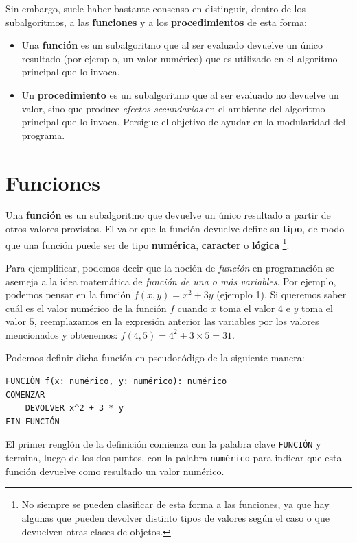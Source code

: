 \documentclass[
]{book}
\providecommand{\tightlist}{%
  \setlength{\itemsep}{0pt}\setlength{\parskip}{0pt}}
\begin{document}
Sin embargo, suele haber bastante consenso en distinguir, dentro de los subalgoritmos, a las \textbf{funciones} y a los \textbf{procedimientos} de esta forma:

\begin{itemize}
\tightlist
\item
  Una \textbf{función} es un subalgoritmo que al ser evaluado devuelve un único resultado (por ejemplo, un valor numérico) que es utilizado en el algoritmo principal que lo invoca.
\item
  Un \textbf{procedimiento} es un subalgoritmo que al ser evaluado no devuelve un valor, sino que produce \emph{efectos secundarios} en el ambiente del algoritmo principal que lo invoca. Persigue el objetivo de ayudar en la modularidad del programa.
\end{itemize}

\hypertarget{funciones}{%
\section{Funciones}\label{funciones}}

Una \textbf{función} es un subalgoritmo que devuelve un único resultado a partir de otros valores provistos. El valor que la función devuelve define su \textbf{tipo}, de modo que una función puede ser de tipo \textbf{numérica}, \textbf{caracter} o \textbf{lógica} \footnote{No siempre se pueden clasificar de esta forma a las funciones, ya que hay algunas que pueden devolver distinto tipos de valores según el caso o que devuelven otras clases de objetos.}.

Para ejemplificar, podemos decir que la noción de \emph{función} en programación se asemeja a la idea matemática de \emph{función de una o más variables}. Por ejemplo, podemos pensar en la función \(f(x, y) = x^2 + 3y\) (ejemplo 1). Si queremos saber cuál es el valor numérico de la función \(f\) cuando \(x\) toma el valor \(4\) e \(y\) toma el valor \(5\), reemplazamos en la expresión anterior las variables por los valores mencionados y obtenemos: \(f(4, 5) = 4^2 + 3 \times 5 = 31\).

Podemos definir dicha función en pseudocódigo de la siguiente manera:

\begin{verbatim}
FUNCIÓN f(x: numérico, y: numérico): numérico
COMENZAR
    DEVOLVER x^2 + 3 * y
FIN FUNCIÓN
\end{verbatim}

El primer renglón de la definición comienza con la palabra clave \texttt{FUNCIÓN} y termina, luego de los dos puntos, con la palabra \texttt{numérico} para indicar que esta función devuelve como resultado un valor numérico.
\end{document}
